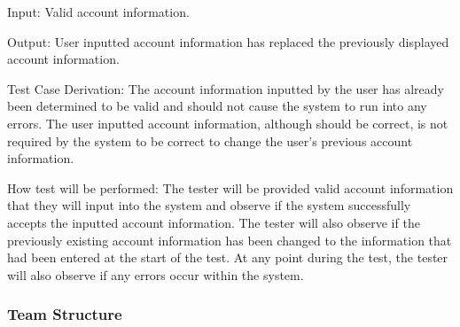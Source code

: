 \documentclass[12pt, titlepage]{article}
\begin{document}
\begin{enumerate}
  Input: Valid account information.
            
  Output: User inputted account information has replaced the previously displayed
  account information.

  Test Case Derivation: The account information inputted by the user has already been
  determined to be valid and should not cause the system to run into any errors. The
  user inputted account information, although should be correct, is not required by
  the system to be correct to change the user's previous account information.
            
  How test will be performed: The tester will be provided valid account information
  that they will input into the system and observe if the system successfully
  accepts the inputted account information. The tester will also observe if the previously
  existing account information has been changed to the information that had been entered
  at the start of the test. At any point during the test, the tester will also observe if
  any errors occur within the system.

\end{enumerate}

\subsubsection{Team Structure}

\end{document}
